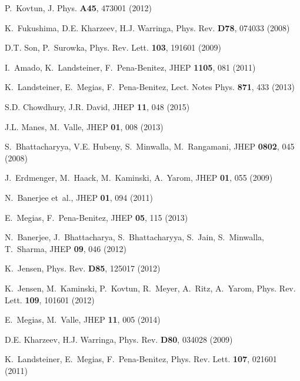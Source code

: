 \documentclass[epj]{webofc}
\begin{document}
\begin{thebibliography}{99}


P.~Kovtun, J. Phys. \textbf{A45}, 473001 (2012)

K.~Fukushima, D.E. Kharzeev, H.J. Warringa, Phys. Rev. \textbf{D78}, 074033 (2008)

D.T. Son, P.~Surowka, Phys. Rev. Lett. \textbf{103}, 191601 (2009)

I.~Amado, K.~Landsteiner, F.~Pena-Benitez, JHEP \textbf{1105}, 081 (2011)

K.~Landsteiner, E.~Megias, F.~Pena-Benitez, Lect. Notes Phys. \textbf{871}, 433
  (2013)

S.D. Chowdhury, J.R. David, JHEP \textbf{11}, 048 (2015)

J.L. Manes, M.~Valle, JHEP \textbf{01}, 008 (2013)

S.~Bhattacharyya, V.E. Hubeny, S.~Minwalla, M.~Rangamani, JHEP \textbf{0802}, 045 (2008)

J.~Erdmenger, M.~Haack, M.~Kaminski, A.~Yarom, JHEP \textbf{01}, 055 (2009)

N.~Banerjee et~al., JHEP \textbf{01}, 094 (2011)

E.~Megias, F.~Pena-Benitez, JHEP \textbf{05}, 115 (2013)

N.~Banerjee, J.~Bhattacharya, S.~Bhattacharyya, S.~Jain, S.~Minwalla,
  T.~Sharma, JHEP \textbf{09}, 046 (2012)

K.~Jensen, Phys. Rev. \textbf{D85}, 125017 (2012)

K.~Jensen, M.~Kaminski, P.~Kovtun, R.~Meyer, A.~Ritz, A.~Yarom, Phys. Rev.
  Lett. \textbf{109}, 101601 (2012)

E.~Megias, M.~Valle, JHEP \textbf{11}, 005 (2014)

D.E. Kharzeev, H.J. Warringa, Phys. Rev. \textbf{D80}, 034028 (2009)

K.~Landsteiner, E.~Megias, F.~Pena-Benitez, Phys. Rev. Lett. \textbf{107},
  021601 (2011)


\end{thebibliography}
\end{document}
